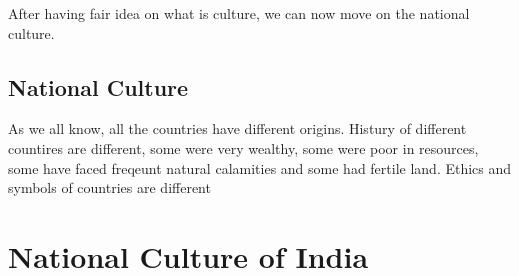 \documentclass{article}
\begin{document}
After having fair idea on what is culture, we can now move on the national culture.

\subsection{National Culture}

As we all know, all the countries have different origins. Histury of different countires are different, some were very wealthy, some were poor in resources, some have faced freqeunt natural calamities and some had fertile land. Ethics and symbols of countries are different 

\section{National Culture of India}
\end{document}
